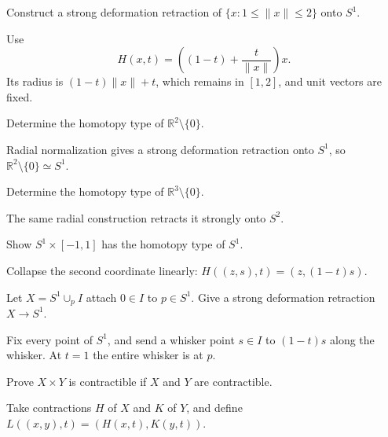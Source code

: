 \begin{problem}\label{prob:viii02-02}
Construct a strong deformation retraction of
\(\{x:1\le\|x\|\le2\}\) onto \(S^1\).
\end{problem}
\begin{solution}
Use
\[
H(x,t)=\left((1-t)+\frac{t}{\|x\|}\right)x.
\]
Its radius is \((1-t)\|x\|+t\), which remains in \([1,2]\), and unit vectors are
fixed.
\end{solution}

\begin{problem}\label{prob:viii02-03}
Determine the homotopy type of \(\mathbb R^2\setminus\{0\}\).
\end{problem}
\begin{solution}
Radial normalization gives a strong deformation retraction onto \(S^1\), so
\(\mathbb R^2\setminus\{0\}\simeq S^1\).
\end{solution}

\begin{problem}\label{prob:viii02-04}
Determine the homotopy type of \(\mathbb R^3\setminus\{0\}\).
\end{problem}
\begin{solution}
The same radial construction retracts it strongly onto \(S^2\).
\end{solution}

\begin{problem}\label{prob:viii02-05}
Show \(S^1\times[-1,1]\) has the homotopy type of \(S^1\).
\end{problem}
\begin{solution}
Collapse the second coordinate linearly:
\(H((z,s),t)=(z,(1-t)s)\).
\end{solution}

\begin{problem}\label{prob:viii02-06}
Let \(X=S^1\cup_{p}I\) attach \(0\in I\) to \(p\in S^1\).  Give a strong
deformation retraction \(X\to S^1\).
\end{problem}
\begin{solution}
Fix every point of \(S^1\), and send a whisker point \(s\in I\) to
\((1-t)s\) along the whisker.  At \(t=1\) the entire whisker is at \(p\).
\end{solution}

\begin{problem}\label{prob:viii02-07}
Prove \(X\times Y\) is contractible if \(X\) and \(Y\) are contractible.
\end{problem}
\begin{solution}
Take contractions \(H\) of \(X\) and \(K\) of \(Y\), and define
\(L((x,y),t)=(H(x,t),K(y,t))\).
\end{solution}

